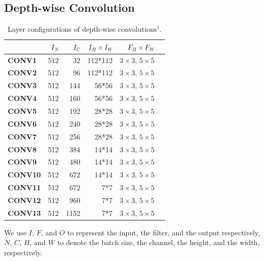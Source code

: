 \subsection{Depth-wise Convolution}
\label{sec:depconvexp}

\begin{table}[]
\caption{Layer configurations of depth-wise  convolutions$^{\dag}$.}
\label{tab:3dconvconfigs}
\centering
{}
\begin{threeparttable}
\begin{tabular}{lrrrrr}
\toprule
& \textbf{$I_N$} & \textbf{$I_C$} & \textbf{$I_H \times I_W$ }&  \textbf{$F_H \times F_W$} \\
\midrule
\textbf{CONV1} & 512  & 32    & 112*112 & $3 \times 3$, $5 \times 5$  \\
\textbf{CONV2} & 512  & 96    & 112*112  &$3 \times 3$, $5 \times 5$   \\
\textbf{CONV3} & 512  & 144   & 56*56  &$3 \times 3$, $5 \times 5$    \\
\textbf{CONV4} & 512  & 160    & 56*56  &$3 \times 3$, $5 \times 5$    \\
\textbf{CONV5} & 512  & 192   & 28*28  &$3 \times 3$, $5 \times 5$    \\
\textbf{CONV6} & 512  & 240   & 28*28  &$3 \times 3$, $5 \times 5$    \\
\textbf{CONV7} & 512  & 256   & 28*28  &$3 \times 3$, $5 \times 5$    \\
\textbf{CONV8} & 512  & 384   & 14*14  &$3 \times 3$, $5 \times 5$    \\
\textbf{CONV9} & 512  & 480   & 14*14  &$3 \times 3$, $5 \times 5$    \\
\textbf{CONV10} & 512  & 672  & 14*14 &$3 \times 3$, $5 \times 5$     \\
\textbf{CONV11} & 512  &672  & 7*7 & $3 \times 3$, $5 \times 5$      \\
\textbf{CONV12} & 512  &960  & 7*7 & $3 \times 3$, $5 \times 5$      \\
\textbf{CONV13} & 512  &1152  & 7*7 & $3 \times 3$, $5 \times 5$      \\
\bottomrule
\end{tabular}
\footnotesize
\begin{tablenotes}
\item[\dag] We use $I$, $F$, and $O$ to represent the input, the filter, and the output respectively, $N$, $C$, $H$, and $W$
to denote the batch size, the channel, the height, and the width, respectively.
\end{tablenotes}
\end{threeparttable}
\vspace{-5mm}
\end{table}


